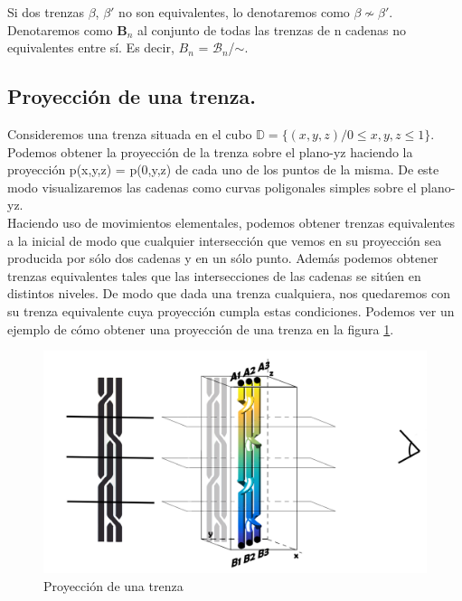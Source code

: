 Si dos trenzas $\beta$, $\beta'$ no son equivalentes, lo denotaremos como $\beta \not \sim \beta'$.\\

Denotaremos como $ \textbf{B}_{n} $ al conjunto de todas las trenzas de n cadenas no equivalentes entre sí. Es decir, ${B}_{n}$ = $\mathscr{B}_{n}$/$ \sim $.\\

\bigskip
\begin{center}
	\subsection{Proyección de una trenza.}
\end{center}
Consideremos una trenza situada en el cubo $\mathds{D} = \{(x,y,z) / 0 \leq x,y,z \leq 1\}$. Podemos obtener la proyección de la trenza sobre el plano-yz haciendo la proyección  p(x,y,z) = p(0,y,z) de cada uno de los puntos de la misma. De este modo visualizaremos las cadenas como curvas poligonales simples sobre el plano-yz.\\

Haciendo uso de movimientos elementales, podemos obtener trenzas equivalentes a la inicial de modo que cualquier intersección que vemos en su proyección sea producida por sólo dos cadenas y en un sólo punto. Además podemos obtener trenzas equivalentes tales que las intersecciones de las cadenas se sitúen en distintos niveles. De modo que dada una trenza cualquiera, nos quedaremos con su trenza equivalente cuya proyección cumpla estas condiciones. Podemos ver un ejemplo de cómo obtener una proyección de una trenza en la figura \ref{impers}.\\ 

\begin{figure}[h!]
	\centering
    \includegraphics[width=15cm]{itrenzas/pers.png}
	\caption{Proyección de una trenza}
	\label{impers} 
\end{figure}

